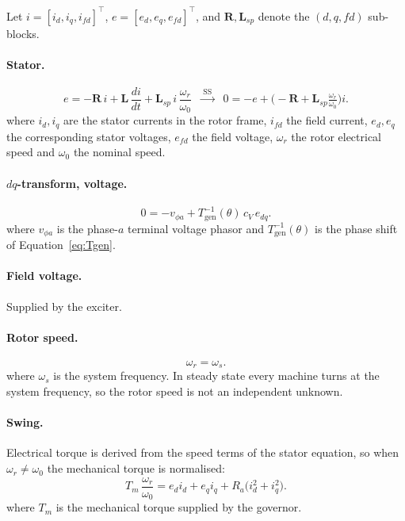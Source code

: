 \documentclass[11pt]{article}
\newcommand{\wnom}{\omega_0}
\newcommand{\wsys}{\omega_s}
\newcommand{\wrot}{\omega_r}
\begin{document}
Let $i=[i_d,i_q,i_{fd}]^\top$, $e=[e_d,e_q,e_{fd}]^\top$, and
$\bm{R},\bm{L}_{sp}$ denote the $(d,q,fd)$ sub-blocks.

\paragraph{Stator.}
\begin{equation}
  e = -\bm{R}\,i + \bm{L}\,\frac{di}{dt} + \bm{L}_{sp}\,i\,\frac{\wrot}{\wnom}
  \;\;\xrightarrow{\;\text{SS}\;}\;\;
  0 = -e + \Big(-\bm{R} + \bm{L}_{sp}\tfrac{\wrot}{\wnom}\Big) i .
\end{equation}
where $i_d,i_q$ are the stator currents in the rotor frame, $i_{fd}$ the
field current, $e_d,e_q$ the corresponding stator voltages, $e_{fd}$ the
field voltage, $\wrot$ the rotor electrical speed and $\wnom$ the nominal
speed.

\paragraph{$dq$-transform, voltage.}
\begin{equation}
  0 = -v_{\phi a} + T_{\text{gen}}^{-1}(\theta)\,c_V\, e_{dq}.
\end{equation}
where $v_{\phi a}$ is the phase-$a$ terminal voltage phasor and
$T_{\text{gen}}^{-1}(\theta)$ is the phase shift of
Equation~\eqref{eq:Tgen}.

\paragraph{Field voltage.}
Supplied by the exciter.

\paragraph{Rotor speed.}
\begin{equation}
  \wrot = \wsys .
\end{equation}
where $\wsys$ is the system frequency. In steady state every machine turns
at the system frequency, so the rotor speed is not an independent unknown.

\paragraph{Swing.}
Electrical torque is derived from the speed terms of the stator equation,
so when $\wrot\neq\wnom$ the mechanical torque is normalised:
\begin{equation}
  T_m\,\frac{\wrot}{\wnom} = e_d i_d + e_q i_q + R_a\big(i_d^2 + i_q^2\big).
  \label{eq:swing}
\end{equation}
where $T_m$ is the mechanical torque supplied by the governor.
\end{document}
